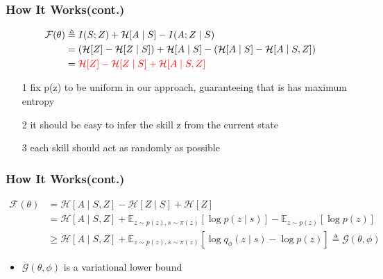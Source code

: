 \documentclass[aspectratio=169]{beamer}
\begin{document}
\begin{frame}
  \frametitle{How It Works(cont.)}
  $$
  \begin{aligned}
  \mathcal{F}(\theta) & \triangleq I(S ; Z)+\mathcal{H}[A \mid S]-I(A ; Z \mid S) \\
  &=(\mathcal{H}[Z]-\mathcal{H}[Z \mid S])+\mathcal{H}[A \mid S]-(\mathcal{H}[A \mid S]-\mathcal{H}[A \mid S, Z]) \\
  &=\textcolor{red}{\mathcal{H}[Z]-\mathcal{H}[Z \mid S]+\mathcal{H}[A \mid S, Z]}
  \end{aligned}
  $$
  \begin{itemize}
    \item [1] fix p(z) to be uniform in our approach, guaranteeing that is has maximum entropy
    \item [2] it should be easy to infer the skill z from the current state
    \item [3] each skill should act as randomly as possible
  \end{itemize}
\end{frame}

\begin{frame}
  \frametitle{How It Works(cont.)}
  $$
  \begin{aligned}
    \mathcal{F}(\theta) &=\mathcal{H}[A \mid S, Z]-\mathcal{H}[Z \mid S]+\mathcal{H}[Z] \\
    &=\mathcal{H}[A \mid S, Z]+\mathbb{E}_{z \sim p(z), s \sim \pi(z)}[\log p(z \mid s)]-\mathbb{E}_{z \sim p(z)}[\log p(z)] \\
    & \geq \mathcal{H}[A \mid S, Z]+\mathbb{E}_{z \sim p(z), s \sim \pi(z)}\left[\log q_{\phi}(z \mid s)-\log p(z)\right] \triangleq \mathcal{G}(\theta, \phi)
  \end{aligned}
  $$
  \begin{itemize}
    \item $\mathcal{G}(\theta, \phi)$ is a variational lower bound
  \end{itemize}
\end{frame}
\end{document}
